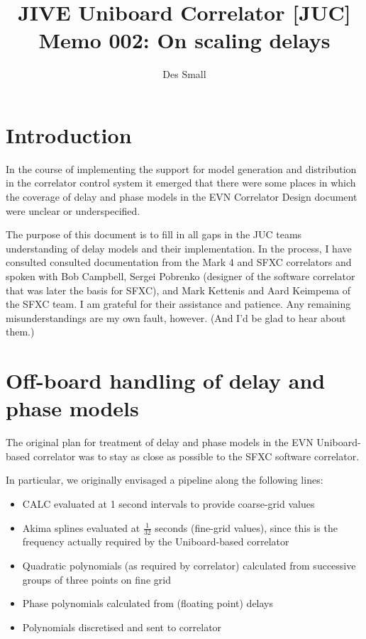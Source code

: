 \documentclass[a4paper]{article}
\title{JIVE Uniboard Correlator [JUC] Memo 002: On scaling delays}
\author{Des Small}
\begin{document}
\maketitle

\section{Introduction}
In the course of implementing the support for model generation and distribution in the correlator control system it emerged that there were some places in which the coverage of delay and phase models in the EVN Correlator Design document\cite{unib} were unclear or underspecified. 

The purpose of this document is to fill in all gaps in the JUC teams understanding of delay models and their implementation.  In the process, I have consulted consulted documentation from the Mark 4 and SFXC correlators and spoken with Bob Campbell, Sergei Pobrenko (designer of the software  correlator that was later the basis for SFXC), and Mark Kettenis and Aard Keimpema of the SFXC team.  I am grateful for their assistance and patience.  Any remaining misunderstandings are my own fault, however.  (And I'd be glad to hear about them.)

\section{Off-board handling of delay and phase models}
The original plan for treatment of delay and phase models in the EVN Uniboard-based correlator was to stay as close as possible to the SFXC software correlator.

In particular, we originally envisaged a pipeline along the following lines:

\begin{itemize}
\item CALC evaluated at 1 second intervals to provide coarse-grid values
\item Akima splines evaluated at $\frac{1}{32}$ seconds (fine-grid   values), since this is the frequency actually required by the   Uniboard-based correlator
\item Quadratic polynomials (as required by correlator) calculated from successive groups of three points on fine grid
\item Phase polynomials calculated from (floating point) delays
\item Polynomials discretised and sent to correlator
\end{itemize}
\end{document}
